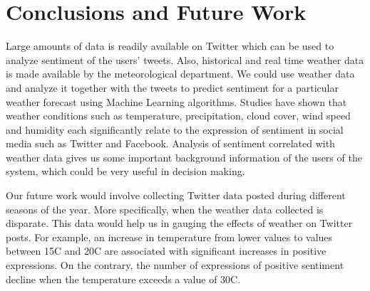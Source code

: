 \documentclass[a4paper,10pt]{article}
\begin{document}
    \section{Conclusions and Future Work}
    \label{conclusion}
     Large amounts of data is readily available on Twitter which can be used to analyze sentiment of the users' tweets. Also, historical and real time weather data is made available by the meteorological department. We could use weather data and analyze it together with the tweets to predict sentiment for a particular weather forecast using Machine Learning algorithms. Studies have shown that weather conditions such as temperature, precipitation, cloud cover, wind speed and humidity each significantly relate to the expression of sentiment in social media such as Twitter and Facebook. Analysis of sentiment correlated with weather data gives us some important background information of the users of the system, which could be very useful in decision making.

     Our future work would involve collecting Twitter data posted during different seasons of the year. More specifically, when the weather data collected is disparate. This data would help us in gauging the effects of weather on Twitter posts.  For example, an increase in temperature from lower values to values between 15C and 20C are associated with significant increases in positive expressions. On the contrary, the number of expressions of positive sentiment decline when the temperature exceeds a value of 30C. 
\end{document}
